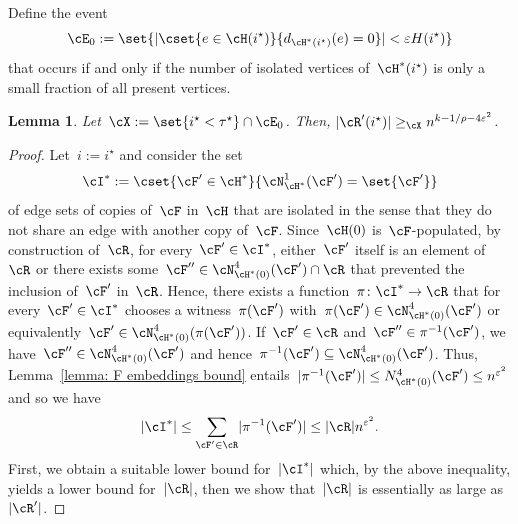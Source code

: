 \documentclass[11pt]{amsart}
\newcommand{\eps}{\varepsilon}
\DeclarePairedDelimiter{\abs}{\lvert}{\rvert}
\newcommand{\Xgeq}{\geq_{\cX}}
\newtheorem{lemma}[algocf]{Lemma}
\theoremstyle{definition}
\numberwithin{equation}{section}
\begin{document}
	Define the event
	\begin{equation*}
		\cE_0:=\set{ \abs{\cset{ e\in \cH(i^\star) }{ d_{\cH^*(i^\star)}(e)=0 }}<\eps H(i^\star)}
	\end{equation*}
	that occurs if and only if the number of isolated vertices of~$\cH^*(i^\star)$ is only a small fraction of all present vertices.
	\begin{lemma}\label{lemma: remain configuration bound}
		Let~$\cX:=\set{i^\star<\tau^\star}\cap \cE_0$.
		Then, $\abs{\cR'(i^\star)}\Xgeq n^{k-1/\rho-4\eps^2}$.
	\end{lemma}
	\begin{proof}
		Let~$i:=i^\star$ and consider the set
		\begin{equation*}
			\cI^*:=\cset{ \cF'\in\cH^* }{ \cN^1_{\cH^*}(\cF')=\set{\cF'}  }
		\end{equation*}
		of edge sets of copies of~$\cF$ in~$\cH$ that are isolated in the sense that they do not share an edge with another copy of~$\cF$.
		Since~$\cH(0)$ is~$\cF$-populated, by construction of~$\cR$, for every~$\cF'\in\cI^*$, either~$\cF'$ itself is an element of~$\cR$ or there exists some~$\cF''\in \cN^4_{\cH^*(0)}(\cF')\cap \cR$ that prevented the inclusion of~$\cF'$ in~$\cR$.
		Hence, there exists a function~$\pi\colon \cI^*\rightarrow \cR$ that for every~$\cF'\in\cI^*$ chooses a witness~$\pi(\cF')$ with~$\pi(\cF')\in \cN^4_{\cH^*(0)}(\cF')$ or equivalently~$\cF'\in \cN^4_{\cH^*(0)}(\pi(\cF'))$.
		If~$\cF'\in\cR$ and~$\cF''\in\pi^{-1}(\cF')$, we have~$\cF''\in \cN^4_{\cH^*(0)}(\cF')$ and hence~$\pi^{-1}(\cF')\subseteq \cN^4_{\cH^*(0)}(\cF')$.
		Thus, Lemma~\ref{lemma: F embeddings bound} entails~$\abs{\pi^{-1}(\cF')}\leq N^4_{\cH^*(0)}(\cF')\leq n^{\eps^{2}}$ and so we have
		\begin{equation}\label{equation: isolated copies and remain configurations}
			\abs{\cI^*}\leq \sum_{\cF'\in\cR} \abs{\pi^{-1}(\cF')}\leq \abs{\cR}n^{\eps^{2}}.
		\end{equation}
		First, we obtain a suitable lower bound for~$\abs{\cI^*}$ which, by the above inequality, yields a lower bound for~$\abs{\cR}$, then we show that~$\abs{\cR}$ is essentially as large as~$\abs{\cR'}$.
		

\end{proof}
\end{document}
